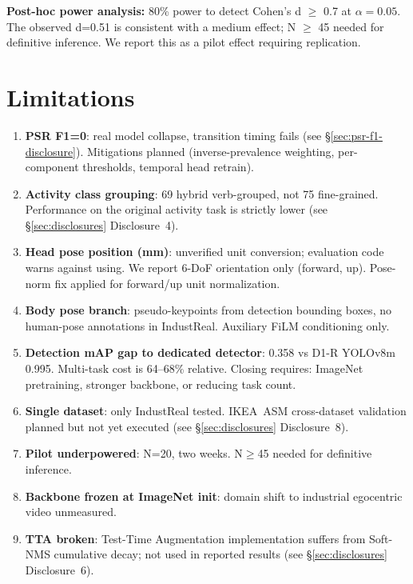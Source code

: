 \documentclass[conference]{IEEEtran}
\newcommand{\industreal}{IndustReal}
\begin{document}
\textbf{Post-hoc power analysis:} 80\% power to detect Cohen's d $\geq$ 0.7 at $\alpha=0.05$. The observed d=0.51 is consistent with a medium effect; N $\geq$ 45 needed for definitive inference. We report this as a pilot effect requiring replication.

\section{Limitations}
\label{sec:limitations}

\begin{enumerate}
\item \textbf{PSR F1=0}: real model collapse, transition timing fails (see \S\ref{sec:psr-f1-disclosure}). Mitigations planned (inverse-prevalence weighting, per-component thresholds, temporal head retrain).
\item \textbf{Activity class grouping}: 69 hybrid verb-grouped, not 75 fine-grained. Performance on the original activity task is strictly lower (see \S\ref{sec:disclosures} Disclosure~4).
\item \textbf{Head pose position (mm)}: unverified unit conversion; evaluation code warns against using. We report 6-DoF orientation only (forward, up). Pose-norm fix applied for forward/up unit normalization.
\item \textbf{Body pose branch}: pseudo-keypoints from detection bounding boxes, no human-pose annotations in \industreal. Auxiliary FiLM conditioning only.
\item \textbf{Detection mAP gap to dedicated detector}: 0.358 vs D1-R YOLOv8m 0.995. Multi-task cost is 64--68\% relative. Closing requires: ImageNet pretraining, stronger backbone, or reducing task count.
\item \textbf{Single dataset}: only \industreal{} tested. IKEA~ASM cross-dataset validation planned but not yet executed (see \S\ref{sec:disclosures} Disclosure~8).
\item \textbf{Pilot underpowered}: N=20, two weeks. N$\geq$45 needed for definitive inference.
\item \textbf{Backbone frozen at ImageNet init}: domain shift to industrial egocentric video unmeasured.
\item \textbf{TTA broken}: Test-Time Augmentation implementation suffers from Soft-NMS cumulative decay; not used in reported results (see \S\ref{sec:disclosures} Disclosure~6).
\end{enumerate}
\end{document}

